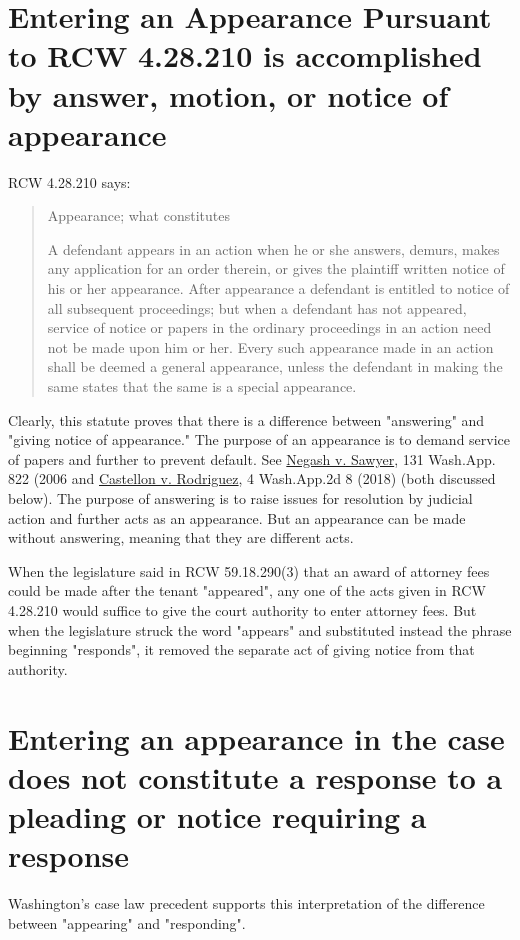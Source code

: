 \documentclass[11pt]{article}
\begin{document}
\section{Entering an Appearance Pursuant to RCW 4.28.210 is accomplished by answer, motion, or notice of appearance}
\label{sec:orge11a96e}

RCW 4.28.210 says:

\begin{quote}
Appearance; what constitutes

A defendant appears in an action when he or she answers, demurs, makes any application for an order therein, or gives the plaintiff written notice of his or her appearance.
After appearance a defendant is entitled to notice of all subsequent proceedings;
but when a defendant has not appeared, service of notice or papers in the ordinary proceedings in an action need not be made upon him or her.
Every such appearance made in an action shall be deemed a general appearance, unless the defendant in making the same states that the same is a special appearance.
\end{quote}

Clearly, this statute proves that there is a difference between "answering" and "giving notice of appearance."  The purpose of an appearance is to demand service of papers and
further to prevent default.  See \uline{Negash v. Sawyer}, 131 Wash.App. 822 (2006 and \uline{Castellon v. Rodriguez}, 4 Wash.App.2d 8 (2018) (both discussed below).
The purpose of answering is to raise issues for resolution by judicial action and further acts as an appearance.  But an appearance can be made without answering, meaning
that they are different acts.

When the legislature said in RCW 59.18.290(3) that an award of attorney fees could be made after the tenant "appeared", any one of the acts given in RCW 4.28.210 would suffice to give
the court authority to enter attorney fees.  But when the legislature struck the word "appears" and substituted instead the phrase beginning "responds", it removed the separate act
of giving notice from that authority.

\section{Entering an appearance in the case does not constitute a response to a pleading or notice requiring a response}
\label{sec:org97cb2b4}

Washington's case law precedent supports this interpretation of the difference between "appearing" and "responding".
\end{document}
